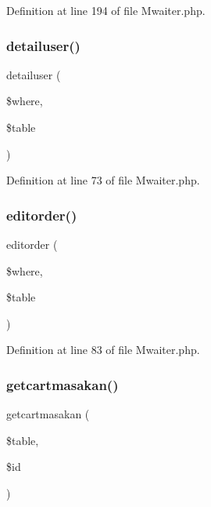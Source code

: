 Definition at line 194 of file Mwaiter.\+php.

\mbox{\label{class_mwaiter_a0816784375f5f69ab5d0aefc27827d55}} 
\subsubsection{\texorpdfstring{detailuser()}{detailuser()}}
{\footnotesize\ttfamily detailuser (\begin{DoxyParamCaption}\item[{}]{\$where,  }\item[{}]{\$table }\end{DoxyParamCaption})}



Definition at line 73 of file Mwaiter.\+php.

\mbox{\label{class_mwaiter_a9d4869568420c3e2e51d3c39010a87d9}} 
\subsubsection{\texorpdfstring{editorder()}{editorder()}}
{\footnotesize\ttfamily editorder (\begin{DoxyParamCaption}\item[{}]{\$where,  }\item[{}]{\$table }\end{DoxyParamCaption})}



Definition at line 83 of file Mwaiter.\+php.

\mbox{\label{class_mwaiter_a2198aaef72ab6b5eb46c54b7a48569cf}} 
\subsubsection{\texorpdfstring{getcartmasakan()}{getcartmasakan()}}
{\footnotesize\ttfamily getcartmasakan (\begin{DoxyParamCaption}\item[{}]{\$table,  }\item[{}]{\$id }\end{DoxyParamCaption})}




